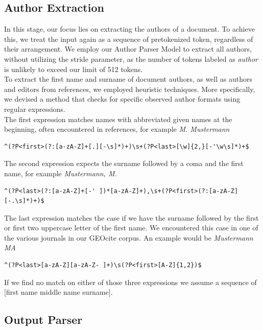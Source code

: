 \subsection{Author Extraction}
In this stage, our focus lies on extracting the authors of a document. To achieve this, we treat the input again as a sequence of pretokenized token, regardless of their arrangement. We employ our Author Parser Model to extract all authors, without utilizing the stride parameter, as the number of tokens labeled as \textit{author} is unlikely to exceed our limit of 512 tokens.\\
To extract the first name and surname of document authors, as well as authors and editors from references, we employed heuristic techniques. More specifically, we devised a method that checks for specific observed author formats using regular expressions.\\
The first expression matches names with abbreviated given names at the beginning, often encountered in references, for example \textit{M. Mustermann}
\begin{Verbatim}[fontsize=\small]
    ^(?P<first>(?:[a-zA-Z]+[.][-\s]*)+)\s+(?P<last>[\w]{2,}[-'\w\s]*)+$
\end{Verbatim}
The second expression expects the surname followed by a coma and the first name, for example \textit{Mustermann, M.}
\begin{Verbatim}[fontsize=\small]
    ^(?P<last>(?:[a-zA-Z]+[-' ])*[a-zA-Z]+),\s+(?P<first>(?:[a-zA-Z][-.\s]*)+)$
\end{Verbatim}
The last expression matches the case if we have the surname followed by the first or first two uppercase letter of the first name. We encountered this case in one of the various journals in our GEOcite corpus. An example would be \textit{Mustermann MA}
\begin{Verbatim}[fontsize=\small]
    ^(?P<last>[a-zA-Z][a-zA-Z- ]+)\s(?P<first>[A-Z]{1,2})$
\end{Verbatim}
If we find no match on either of those three expressions we assume a sequence of [first name middle name surname].

\subsection{Output Parser}

